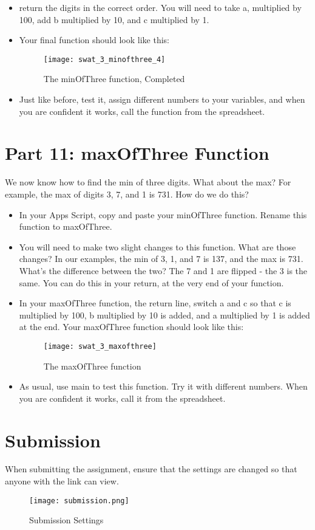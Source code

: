 \documentclass{article}
\begin{document}
\begin{itemize}
	\item return the digits in the correct order.  You will need to take a, multiplied by 100, add b multiplied by 10, and c multiplied by 1.
	\item Your final function should look like this:
	\begin{figure}[H]
  		\centering
  		\texttt{[image: swat\_3\_minofthree\_4]}
  		\caption{The minOfThree function, Completed}
	\end{figure}
	\item Just like before, test it, assign different numbers to your variables, and when you are confident it works, call the function from the spreadsheet.
\end{itemize}

\section*{Part 11: maxOfThree Function}
We now know how to find the min of three digits.  What about the max?  For example, the max of digits 3, 7, and 1 is 731.  How do we do this?
 \begin{itemize}
	\item In your Apps Script, copy and paste your minOfThree function.  Rename this function to maxOfThree.
	\item You will need to make two slight changes to this function.  What are those changes?  In our examples, the min of 3, 1, and 7 is 137, and the max is 731.  What's the difference between the two?  The 7 and 1 are flipped - the 3 is the same. You can do this in your return, at the very end of your function.
	\item In your maxOfThree function, the return line, switch a and c so that c is multiplied by 100, b multiplied by 10 is added, and a multiplied by 1 is added at the end.  Your maxOfThree function should look like this:
	 \begin{figure}[H]
  		\centering
  		\texttt{[image: swat\_3\_maxofthree]}
  		\caption{The maxOfThree function}
	\end{figure}
	\item As usual, use main to test this function.  Try it with different numbers.  When you are confident it works, call it from the spreadsheet.
\end{itemize}

\section*{Submission}
When submitting the assignment, ensure that the settings are changed so that anyone with the link can view.
\begin{figure}[H]
  \centering
  \texttt{[image: submission.png]}
  \caption{Submission Settings}
\end{figure}
\end{document}
